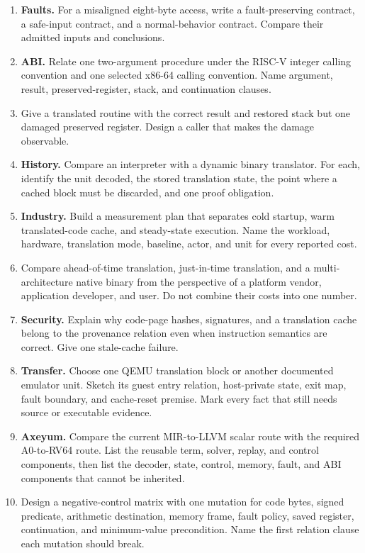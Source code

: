 \begin{enumerate}
\item \textbf{Faults.} For a misaligned eight-byte access, write a
fault-preserving contract, a safe-input contract, and a normal-behavior
contract. Compare their admitted inputs and conclusions.

\item \textbf{ABI.} Relate one two-argument procedure under the
RISC-V integer calling convention and one selected x86-64 calling convention.
Name argument, result, preserved-register, stack, and continuation clauses.

\item Give a translated routine with the correct result and restored stack but
one damaged preserved register. Design a caller that makes the damage
observable.

\item \textbf{History.} Compare an interpreter with a dynamic binary
translator. For each, identify the unit decoded, the stored translation state,
the point where a cached block must be discarded, and one proof obligation.

\item \textbf{Industry.} Build a measurement plan that separates cold startup,
warm translated-code cache, and steady-state execution. Name the workload,
hardware, translation mode, baseline, actor, and unit for every reported cost.

\item Compare ahead-of-time translation, just-in-time translation, and a
multi-architecture native binary from the perspective of a platform vendor,
application developer, and user. Do not combine their costs into one number.

\item \textbf{Security.} Explain why code-page hashes, signatures, and a
translation cache belong to the provenance relation even when instruction
semantics are correct. Give one stale-cache failure.

\item \textbf{Transfer.} Choose one QEMU translation block or another
documented emulator unit. Sketch its guest entry relation, host-private state,
exit map, fault boundary, and cache-reset premise. Mark every fact that still
needs source or executable evidence.

\item \textbf{Axeyum.} Compare the current MIR-to-LLVM scalar route with the
required A0-to-RV64 route. List the reusable term, solver, replay, and control
components, then list the decoder, state, control, memory, fault, and ABI
components that cannot be inherited.

\item Design a negative-control matrix with one mutation for code bytes,
signed predicate, arithmetic destination, memory frame, fault policy, saved
register, continuation, and minimum-value precondition. Name the first
relation clause each mutation should break.
\end{enumerate}
